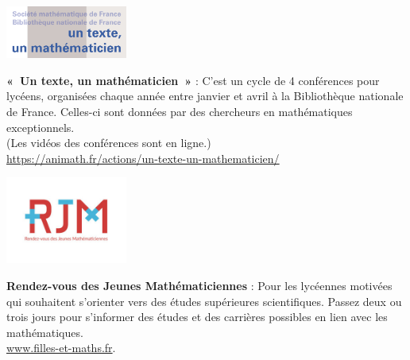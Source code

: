 \begin{minipage}[c]{.46\linewidth}
\includegraphics[width=40mm]{01-Intro/logos/utum.png}
\end{minipage}
\begin{minipage}[c]{.46\linewidth}
\textbf{«~Un texte, un mathématicien~»} : C'est un cycle de 4 conférences pour lycéens, organisées chaque année entre janvier et avril à la
Bibliothèque nationale de France. Celles-ci sont données par des chercheurs en mathématiques exceptionnels. \\
(Les vidéos des conférences sont en ligne.) \\
\url{https://animath.fr/actions/un-texte-un-mathematicien/}
\end{minipage} \hfill

\vfill
\vspace{4mm}

\pagebreak
\begin{minipage}[c]{.46\linewidth}
\includegraphics[width=40mm]{01-Intro/logos/rjm.jpg}
\end{minipage}
\begin{minipage}[c]{.46\linewidth}	
\textbf{Rendez-vous des Jeunes Mathématiciennes} :
Pour les lycéennes motivées qui souhaitent s’orienter vers des études supérieures scientifiques. Passez deux ou trois jours pour s'informer des études et des carrières possibles en lien avec les mathématiques.
\\ \url{www.filles-et-maths.fr}.
\end{minipage} \hfill



\vspace{4mm}



